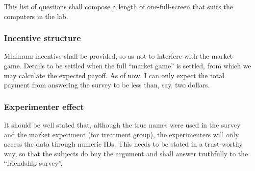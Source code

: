 This list of questions shall compose a length of one-full-screen that suits the
computers in the lab.

\subsubsection{Incentive structure}

Minimum incentive shall be provided, so as not to interfere with the market
game. Details to be settled when the full ``market game'' is settled, from which
we may calculate the expected payoff. As of now, I can only expect the total
payment from answering the survey to be less than, say, two dollars.

\subsubsection{Experimenter effect}

It should be well stated that, although the true names were used in the survey
and the market experiment (for treatment group), the experimenters will only
access the data through numeric IDs. This needs to be stated in a trust-worthy
way, so that the subjects do buy the argument and shall answer truthfully to the
``friendship survey''.